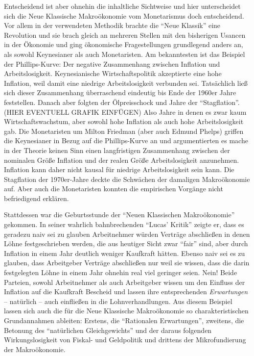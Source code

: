 Entscheidend ist aber ohnehin die inhaltliche Sichtweise und hier unterscheidet sich die Neue Klassische Makroökonomie vom Monetarismus doch entscheidend. Vor allem in der verwendeten Methodik brachte die "`Neue Klassik"' eine Revolution und sie brach gleich an mehreren Stellen mit den bisherigen Usancen in der Ökonomie und ging ökonomische Fragestellungen grundlegend anders an, als sowohl Keynesianer als auch Monetaristen. Am bekanntesten ist das Beispiel der Phillips-Kurve: Der negative Zusammenhang zwischen Inflation und Arbeitslosigkeit. Keynesianische Wirtschaftspolitik akzeptierte eine hohe Inflation, weil damit eine niedrige Arbeitslosigkeit verbunden sei. Tatsächlich ließ sich dieser Zusammenhang überraschend eindeutig bis Ende der 1960er Jahre feststellen. Danach aber folgten der Ölpreisschock und Jahre der "`Stagflation"'. (HIER EVENTUELL GRAFIK EINFÜGEN) Also Jahre in denen es zwar kaum Wirtschaftswachstum, aber sowohl hohe Inflation als auch hohe Arbeitslosigkeit gab. Die Monetaristen um Milton Friedman (aber auch Edmund Phelps) griffen die Keynesianer in Bezug auf die Phillips-Kurve an und argumentierten es mache in der Theorie keinen Sinn einen langfristigen Zusammenhang zwischen der nominalen Größe Inflation und der realen Größe Arbeitslosigkeit anzunehmen. Inflation kann daher nicht kausal für niedrige Arbeitslosigkeit sein kann. Die Stagflation der 1970er-Jahre deckte die Schwächen der damaligen Makroökonomie auf. Aber auch die Monetaristen konnten die empirischen Vorgänge nicht befriedigend erklären.

Stattdessen war die Geburtsstunde der "`Neuen Klassischen Makroökonomie"' gekommen. In seiner wahrlich bahnbrechenden "`Lucas' Kritik"' \parencite[S. 19ff]{Lucas1976} zeigte er, dass es geradezu naiv sei zu glauben Arbeitnehmer würden Verträge abschließen in denen Löhne festgeschrieben werden, die aus heutiger Sicht zwar "`fair"' sind, aber durch Inflation in einem Jahr deutlich weniger Kaufkraft hätten. Ebenso naiv sei es zu glauben, dass Arbeitgeber Verträge abschließen nur weil sie wissen, dass die darin festgelegten Löhne in einem Jahr ohnehin real viel geringer seien. Nein! Beide Parteien, sowohl Arbeitnehmer als auch Arbeitgeber wissen um den Einfluss der Inflation auf die Kaufkraft Bescheid und lassen ihre entsprechenden \textit{Erwartungen} -- natürlich -- auch einfließen in die Lohnverhandlungen. Aus diesem Beispiel lassen sich auch die für die Neue Klassische Makroökonomie so charakteristischen Grundannahmen ableiten: Erstens, die "`Rationalen Erwartungen"', zweitens, die Betonung des "`natürlichen Gleichgewichts"' und der daraus folgenden Wirkungslosigkeit von Fiskal- und Geldpolitik und drittens der Mikrofundierung der Makroökonomie.

